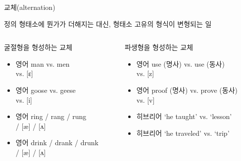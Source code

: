 \documentclass[11pt, aspectratio=169]{beamer}
\newcommand{\textds}[1]{{\ipafont #1}}
\begin{document}
\begin{frame}[t]{교체(alternation)}
  \begin{block}{정의}
    형태소에 뭔가가 더해지는 대신, 형태소 고유의 형식이 변형되는 일
  \end{block}
  \begin{columns}
    \begin{column}[T]{0.46\textwidth}
      \begin{block}{굴절형을 형성하는 교체}
      \begin{itemize}
        \item 영어 man vs. men \\ \textds{[æ] vs. [ɛ]}
        \item 영어 goose vs. geese \\ \textds{[u] vs. [i]}
        \item 영어 ring / rang / rung \\ \textds{[ɪ] / [æ] / [ʌ]}
        \item 영어 drink / drank / drunk \\ \textds{[ɪ] / [æ] / [ʌ]}
      \end{itemize}
        
      \end{block}
    \end{column}
    \begin{column}[T]{0.47\textwidth}
      \begin{block}{파생형을 형성하는 교체}
      \begin{itemize}
        \item 영어	use (명사) vs. use (동사) \\ \textds{[s] vs. [z]}
        \item 영어	proof (명사) vs. prove (동사) \\ \textds{[f] vs. [v]}
        \item 히브리어 \textds{[limed]} ‘he taught’ vs. \textds{[limud]} ‘lesson’
        \item 히브리어 \textds{[tijel]} ‘he traveled’ vs. \textds{[tijul]} ‘trip’
      \end{itemize}        
      \end{block}
    \end{column}
  \end{columns}
\end{frame}
\end{document}
